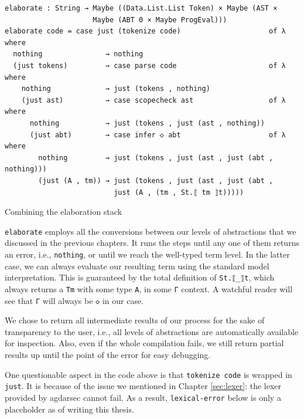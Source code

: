 \begin{listing}[H]
\begin{verbatim}
elaborate : String → Maybe ((Data.List.List Token) × Maybe (AST ×
                     Maybe (ABT 0 × Maybe ProgEval)))
elaborate code = case just (tokenize code)                     of λ where
  nothing               → nothing
  (just tokens)         → case parse code                      of λ where
    nothing             → just (tokens , nothing)
    (just ast)          → case scopecheck ast                  of λ where
      nothing           → just (tokens , just (ast , nothing))
      (just abt)        → case infer ◇ abt                     of λ where
        nothing         → just (tokens , just (ast , just (abt , nothing)))
        (just (A , tm)) → just (tokens , just (ast , just (abt ,
                          just (A , (tm , St.⟦ tm ⟧t)))))
\end{verbatim}
\caption{Combining the elaboration stack}
\label{code:elab-elaborate}
\end{listing}

\verb$elaborate$ employs all the conversions between our levels of abstractions that we discussed in the previous chapters. It runs the steps until any one of them returns an error, i.e., \verb$nothing$, or until we reach the well-typed term level. In the latter case, we can always evaluate our resulting term using the standard model interpretation. This is guaranteed by the total definition of \verb$St.⟦_⟧t$, which always returns a \verb$Tm$ with some type \verb$A$, in some \verb$Γ$ context. A watchful reader will see that \verb$Γ$ will always be \verb$◇$ in our case.

We chose to return all intermediate results of our process for the sake of transparency to the user, i.e., all levels of abstractions are automatically available for inspection. Also, even if the whole compilation fails, we still return partial results up until the point of the error for easy debugging.

One questionable aspect in the code above is that \verb$tokenize code$ is wrapped in \verb$just$. It is because of the issue we mentioned in Chapter \ref{sec:lexer}: the lexer provided by agdarsec cannot fail. As a result, \verb$lexical-error$ below is only a placeholder as of writing this thesis.

